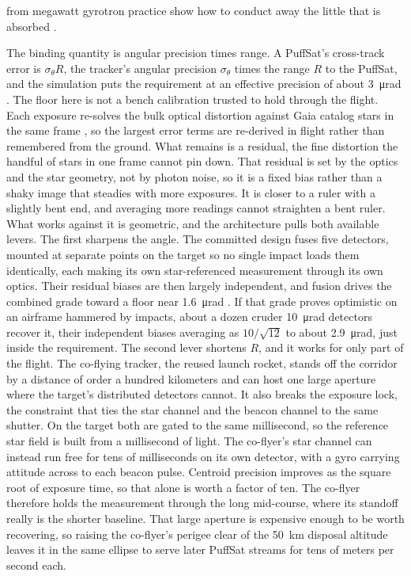 \documentclass{article}
\begin{document}
from megawatt gyrotron practice show how to conduct away the little that is absorbed \cite{thumm2001diamond}.

The binding quantity is angular precision times range. A PuffSat's cross-track error is $\sigma_\theta R$, the tracker's angular precision $\sigma_\theta$ times the range $R$ to the PuffSat, and the simulation puts the requirement at an effective precision of about \SI{3}{\micro\radian} \cite{Katz_puffsat_control_sim_2026}. The floor here is not a bench calibration trusted to hold through the flight. Each exposure re-solves the bulk optical distortion against Gaia catalog stars in the same frame \cite{lindegren2018gaia}, so the largest error terms are re-derived in flight rather than remembered from the ground. What remains is a residual, the fine distortion the handful of stars in one frame cannot pin down. That residual is set by the optics and the star geometry, not by photon noise, so it is a fixed bias rather than a shaky image that steadies with more exposures. It is closer to a ruler with a slightly bent end, and averaging more readings cannot straighten a bent ruler. What works against it is geometric, and the architecture pulls both available levers. The first sharpens the angle. The committed design fuses five detectors, mounted at separate points on the target so no single impact loads them identically, each making its own star-referenced measurement through its own optics. Their residual biases are then largely independent, and fusion drives the combined grade toward a floor near \SI{1.6}{\micro\radian} \cite{Katz_puffsat_control_sim_2026}. If that grade proves optimistic on an airframe hammered by impacts, about a dozen cruder \SI{10}{\micro\radian} detectors recover it, their independent biases averaging as $10/\sqrt{12}$ to about \SI{2.9}{\micro\radian}, just inside the requirement. The second lever shortens $R$, and it works for only part of the flight. The co-flying tracker, the reused launch rocket, stands off the corridor by a distance of order a hundred kilometers and can host one large aperture where the target's distributed detectors cannot. It also breaks the exposure lock, the constraint that ties the star channel and the beacon channel to the same shutter. On the target both are gated to the same millisecond, so the reference star field is built from a millisecond of light. The co-flyer's star channel can instead run free for tens of milliseconds on its own detector, with a gyro carrying attitude across to each beacon pulse. Centroid precision improves as the square root of exposure time, so that alone is worth a factor of ten. The co-flyer therefore holds the measurement through the long mid-course, where its standoff really is the shorter baseline. That large aperture is expensive enough to be worth recovering, so raising the co-flyer's perigee clear of the \SI{50}{\kilo\meter} disposal altitude leaves it in the same ellipse to serve later PuffSat streams for tens of meters per second each.
\end{document}
